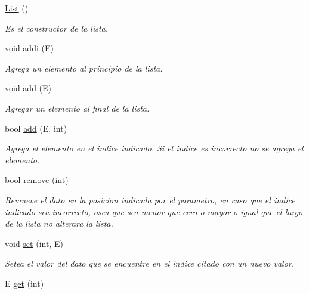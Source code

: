 \begin{DoxyCompactItemize}
\item 
\hypertarget{classList_ae47afd06bd8c39fe7a12d4489998e7c5}{\hyperlink{classList_ae47afd06bd8c39fe7a12d4489998e7c5}{List} ()}\label{classList_ae47afd06bd8c39fe7a12d4489998e7c5}

\begin{DoxyCompactList}\small\item\em Es el constructor de la lista. \end{DoxyCompactList}\item 
void \hyperlink{classList_a40dfa61150de7310d69001c697598b04}{addi} (E)
\begin{DoxyCompactList}\small\item\em Agrega un elemento al principio de la lista. \end{DoxyCompactList}\item 
void \hyperlink{classList_a2a130b7bc38cd968136f1f847e42d0cc}{add} (E)
\begin{DoxyCompactList}\small\item\em Agregar un elemento al final de la lista. \end{DoxyCompactList}\item 
bool \hyperlink{classList_a530267346ebec244900c162de6f467e1}{add} (E, int)
\begin{DoxyCompactList}\small\item\em Agrega el elemento en el indice indicado. Si el indice es incorrecto no se agrega el elemento. \end{DoxyCompactList}\item 
bool \hyperlink{classList_a46cec78299d3e23469276adf46adf9c1}{remove} (int)
\begin{DoxyCompactList}\small\item\em Remueve el dato en la posicion indicada por el parametro, en caso que el indice indicado sea incorrecto, osea que sea menor que cero o mayor o igual que el largo de la lista no alterara la lista. \end{DoxyCompactList}\item 
void \hyperlink{classList_ac8b31be96806bd56f655436629ac2e7a}{set} (int, E)
\begin{DoxyCompactList}\small\item\em Setea el valor del dato que se encuentre en el indice citado con un nuevo valor. \end{DoxyCompactList}\item 
E \hyperlink{classList_ab081a52d7a62aa6c5550ff9762f9427f}{get} (int)

\end{DoxyCompactItemize}

